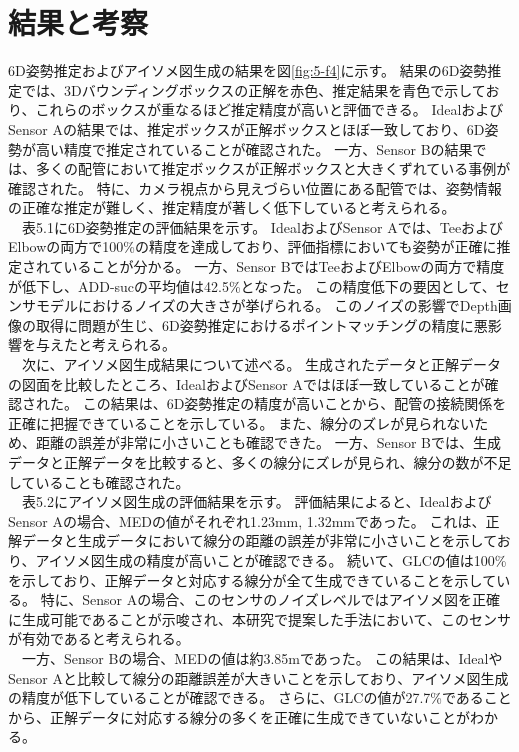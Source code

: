\section{結果と考察}
6D姿勢推定およびアイソメ図生成の結果を図\ref{fig:5-f4}に示す。
結果の6D姿勢推定では、3Dバウンディングボックスの正解を赤色、推定結果を青色で示しており、これらのボックスが重なるほど推定精度が高いと評価できる。
IdealおよびSensor Aの結果では、推定ボックスが正解ボックスとほぼ一致しており、6D姿勢が高い精度で推定されていることが確認された。
一方、Sensor Bの結果では、多くの配管において推定ボックスが正解ボックスと大きくずれている事例が確認された。
特に、カメラ視点から見えづらい位置にある配管では、姿勢情報の正確な推定が難しく、推定精度が著しく低下していると考えられる。\\
　表5.1に6D姿勢推定の評価結果を示す。
IdealおよびSensor Aでは、TeeおよびElbowの両方で100\%の精度を達成しており、評価指標においても姿勢が正確に推定されていることが分かる。
一方、Sensor BではTeeおよびElbowの両方で精度が低下し、ADD-sucの平均値は42.5\%となった。
この精度低下の要因として、センサモデルにおけるノイズの大きさが挙げられる。
このノイズの影響でDepth画像の取得に問題が生じ、6D姿勢推定におけるポイントマッチングの精度に悪影響を与えたと考えられる。\\
　次に、アイソメ図生成結果について述べる。
生成されたデータと正解データの図面を比較したところ、IdealおよびSensor Aではほぼ一致していることが確認された。
この結果は、6D姿勢推定の精度が高いことから、配管の接続関係を正確に把握できていることを示している。
また、線分のズレが見られないため、距離の誤差が非常に小さいことも確認できた。
一方、Sensor Bでは、生成データと正解データを比較すると、多くの線分にズレが見られ、線分の数が不足していることも確認された。\\
　表5.2にアイソメ図生成の評価結果を示す。
評価結果によると、IdealおよびSensor Aの場合、MEDの値がそれぞれ1.23mm, 1.32mmであった。
これは、正解データと生成データにおいて線分の距離の誤差が非常に小さいことを示しており、アイソメ図生成の精度が高いことが確認できる。
続いて、GLCの値は100\%を示しており、正解データと対応する線分が全て生成できていることを示している。
特に、Sensor Aの場合、このセンサのノイズレベルではアイソメ図を正確に生成可能であることが示唆され、本研究で提案した手法において、このセンサが有効であると考えられる。\\
　一方、Sensor Bの場合、MEDの値は約3.85mであった。
この結果は、IdealやSensor Aと比較して線分の距離誤差が大きいことを示しており、アイソメ図生成の精度が低下していることが確認できる。
さらに、GLCの値が27.7\%であることから、正解データに対応する線分の多くを正確に生成できていないことがわかる。
